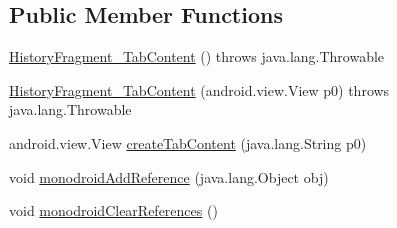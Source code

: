 \subsection*{Public Member Functions}
\begin{DoxyCompactItemize}
\item 
\hyperlink{classfieldservice_1_1android_1_1fragments_1_1_history_fragment___tab_content_ab6b3e1c2ba34c6582639dea742ed2496}{History\+Fragment\+\_\+\+Tab\+Content} ()  throws java.\+lang.\+Throwable 	
\item 
\hyperlink{classfieldservice_1_1android_1_1fragments_1_1_history_fragment___tab_content_a441f35273739a1f8c9dddf428ec78852}{History\+Fragment\+\_\+\+Tab\+Content} (android.\+view.\+View p0)  throws java.\+lang.\+Throwable 	
\item 
android.\+view.\+View \hyperlink{classfieldservice_1_1android_1_1fragments_1_1_history_fragment___tab_content_a3c4e757c2af9e622c83e6bf71adb8dfc}{create\+Tab\+Content} (java.\+lang.\+String p0)
\item 
void \hyperlink{classfieldservice_1_1android_1_1fragments_1_1_history_fragment___tab_content_aa3f0d77015760ba827e06092bcbb8937}{monodroid\+Add\+Reference} (java.\+lang.\+Object obj)
\item 
void \hyperlink{classfieldservice_1_1android_1_1fragments_1_1_history_fragment___tab_content_ae50f9c18f7a05b65225b55e38c0cc623}{monodroid\+Clear\+References} ()
\end{DoxyCompactItemize}


